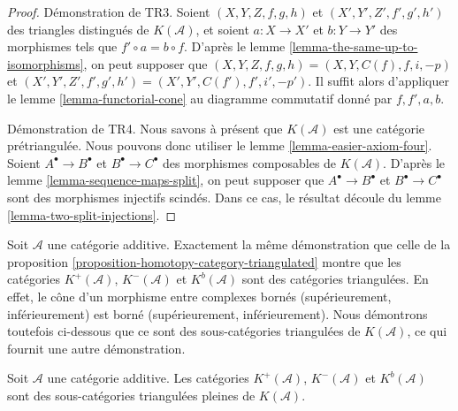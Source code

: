 \begin{proof}
\medskip\noindent
Démonstration de TR3. Soient
$(X, Y, Z, f, g, h)$ et $(X', Y', Z', f', g', h')$ des triangles distingués de
$K(\mathcal{A})$, et soient $a : X \to X'$ et $b : Y \to Y'$ des morphismes
tels que $f' \circ a = b \circ f$. D'après le
lemme \ref{lemma-the-same-up-to-isomorphisms}, on peut supposer que
$(X, Y, Z, f, g, h) = (X, Y, C(f), f, i, -p)$ et
$(X', Y', Z', f', g', h') = (X', Y', C(f'), f', i', -p')$.
Il suffit alors d'appliquer le lemme \ref{lemma-functorial-cone} au diagramme
commutatif donné par $f, f', a, b$.

\medskip\noindent
Démonstration de TR4. Nous savons à présent que $K(\mathcal{A})$ est une
catégorie prétriangulée. Nous pouvons donc utiliser le
lemme \ref{lemma-easier-axiom-four}. Soient
$A^\bullet \to B^\bullet$ et $B^\bullet \to C^\bullet$ des morphismes
composables de $K(\mathcal{A})$. D'après le
lemme \ref{lemma-sequence-maps-split}, on peut supposer que
$A^\bullet \to B^\bullet$ et $B^\bullet \to C^\bullet$ sont des morphismes
injectifs scindés. Dans ce cas, le résultat découle du
lemme \ref{lemma-two-split-injections}.
\end{proof}

\begin{remark}
\label{remark-boundedness-conditions-triangulated}
Soit $\mathcal{A}$ une catégorie additive. Exactement la même démonstration que
celle de la proposition \ref{proposition-homotopy-category-triangulated}
montre que les catégories
$K^{+}(\mathcal{A})$, $K^{-}(\mathcal{A})$ et $K^b(\mathcal{A})$ sont des
catégories triangulées. En effet, le cône d'un morphisme entre complexes bornés
(supérieurement, inférieurement) est borné (supérieurement, inférieurement).
Nous démontrons toutefois ci-dessous que ce sont des sous-catégories
triangulées de $K(\mathcal{A})$, ce qui fournit une autre démonstration.
\end{remark}

\begin{lemma}
\label{lemma-bounded-triangulated-subcategories}
Soit $\mathcal{A}$ une catégorie additive. Les catégories
$K^{+}(\mathcal{A})$, $K^{-}(\mathcal{A})$ et $K^b(\mathcal{A})$ sont des
sous-catégories triangulées pleines de $K(\mathcal{A})$.
\end{lemma}

